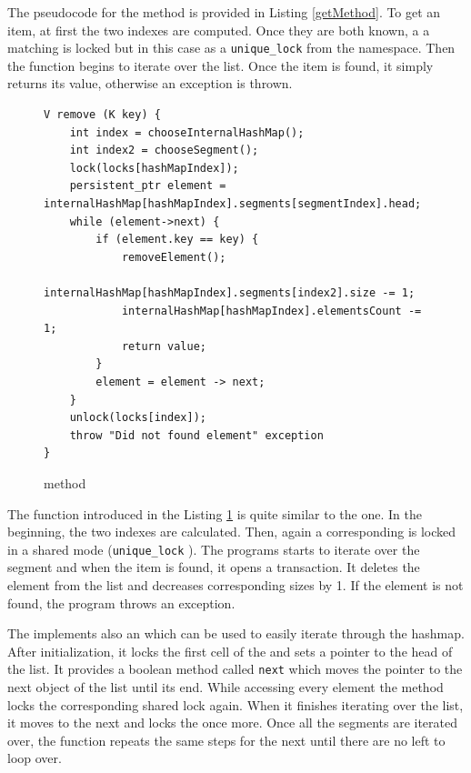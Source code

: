         The pseudocode for the \getMethod method is provided in Listing \ref{getMethod}. 
        To get an item, at first the two indexes are computed. 
        Once they are both known, a a matching \internalHashMap is locked but in this case as a \texttt{unique\_lock} \cite{UniqueLock} from the \std namespace.
        Then the function begins to iterate over the list. 
        Once the item is found, it simply returns its value, otherwise an exception is thrown.
        
\begin{figure}[ht]
\renewcommand{\figurename}{Listing}
\begin{lstlisting}
V remove (K key) {
    int index = chooseInternalHashMap();
    int index2 = chooseSegment();
    lock(locks[hashMapIndex]);
    persistent_ptr element = internalHashMap[hashMapIndex].segments[segmentIndex].head;
    while (element->next) {
        if (element.key == key) {
            removeElement();
            internalHashMap[hashMapIndex].segments[index2].size -= 1;
            internalHashMap[hashMapIndex].elementsCount -= 1;
            return value;
        }
        element = element -> next;
    } 
    unlock(locks[index]);
    throw "Did not found element" exception
}
\end{lstlisting}
\caption{\removeMethod method}
\label{removeMethod}
\end{figure}

        The \removeMethod function introduced in the Listing \ref{removeMethod} is quite similar to the \getMethod one. 
        In the beginning, the two indexes are calculated. 
        Then, again a corresponding \internalHashMap is locked in a shared mode (\texttt{unique\_lock} \cite{UniqueLock}).
        The programs starts to iterate over the segment and when the item is found, it opens a transaction. 
        It deletes the element from the list and decreases corresponding sizes by 1.
        If the element is not found, the program throws an exception.

        The \NvmHashMap implements also an \Iterator which can be used to easily iterate through the hashmap.
        After initialization, it locks the first cell of the \internalHashMap and sets a pointer to the head of the list.
        It provides a boolean method called \texttt{next} which moves the pointer to the next object of the list until its end. 
        While accessing every element the method locks the corresponding shared lock again. 
        When it finishes iterating over the list, it moves to the next \Segment and locks the \internalHashMaps once more. 
        Once all the segments are iterated over, the function repeats the same steps for the next \internalHashMap until there are no left to loop over.
        
